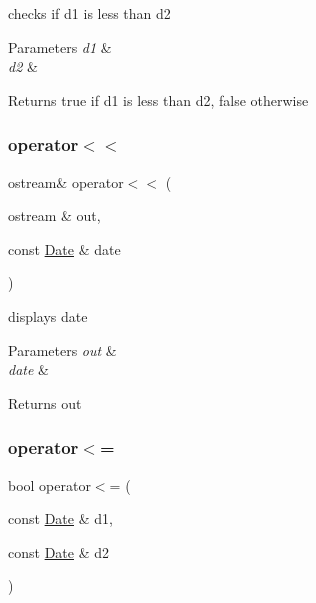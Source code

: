 checks if d1 is less than d2 


\begin{DoxyParams}{Parameters}
{\em d1} & \\
\hline
{\em d2} & \\
\hline
\end{DoxyParams}
\begin{DoxyReturn}{Returns}
true if d1 is less than d2, false otherwise 
\end{DoxyReturn}
\hypertarget{class_date_a5c29d00ecf33e6d232a410f1f3d6eb70}{}\label{class_date_a5c29d00ecf33e6d232a410f1f3d6eb70} 
\subsubsection{\texorpdfstring{operator$<$$<$}{operator<<}}
{\footnotesize\ttfamily ostream\& operator$<$$<$ (\begin{DoxyParamCaption}\item[{ostream \&}]{out,  }\item[{const \hyperlink{class_date}{Date} \&}]{date }\end{DoxyParamCaption})\hspace{0.3cm}{\ttfamily [friend]}}



displays date 


\begin{DoxyParams}{Parameters}
{\em out} & \\
\hline
{\em date} & \\
\hline
\end{DoxyParams}
\begin{DoxyReturn}{Returns}
out 
\end{DoxyReturn}
\hypertarget{class_date_a4f314b2216e8760eac284385a7eaae12}{}\label{class_date_a4f314b2216e8760eac284385a7eaae12} 
\subsubsection{\texorpdfstring{operator$<$=}{operator<=}}
{\footnotesize\ttfamily bool operator$<$= (\begin{DoxyParamCaption}\item[{const \hyperlink{class_date}{Date} \&}]{d1,  }\item[{const \hyperlink{class_date}{Date} \&}]{d2 }\end{DoxyParamCaption})\hspace{0.3cm}{\ttfamily [friend]}}



